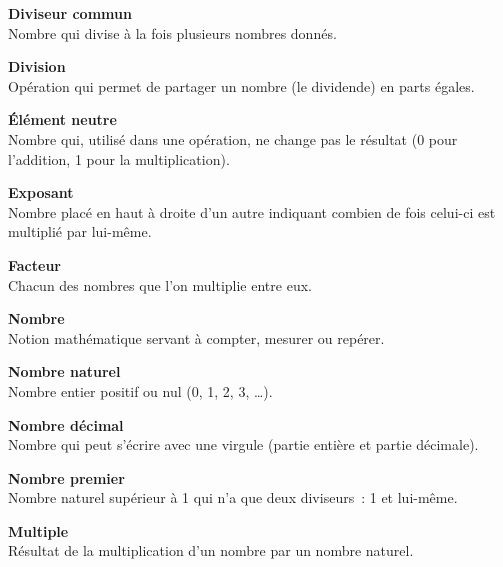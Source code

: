 \begin{tcbraster}[raster columns=2, raster equal height, raster valign=top,raster column skip=2mm, raster row skip=2mm]
\begin{terme}
\textbf{\large Diviseur commun}\\[2pt]
{\small Nombre qui divise à la fois plusieurs nombres donnés.}
\end{terme}
\begin{terme}
\textbf{\large Division}\\[2pt]
{\small Opération qui permet de partager un nombre (le dividende) en parts égales.}
\end{terme}
\begin{terme}
\textbf{\large Élément neutre}\\[2pt]
{\small Nombre qui, utilisé dans une opération, ne change pas le résultat (0 pour l'addition, 1 pour la multiplication).}
\end{terme}
\begin{terme}
\textbf{\large Exposant}\\[2pt]
{\small Nombre placé en haut à droite d'un autre indiquant combien de fois celui-ci est multiplié par lui-même.}
\end{terme}
\begin{terme}
\textbf{\large Facteur}\\[2pt]
{\small Chacun des nombres que l'on multiplie entre eux.}
\end{terme}
\begin{terme}
\textbf{\large Nombre}\\[2pt]
{\small Notion mathématique servant à compter, mesurer ou repérer.}
\end{terme}
\begin{terme}
\textbf{\large Nombre naturel}\\[2pt]
{\small Nombre entier positif ou nul (0, 1, 2, 3, \ldots).}
\end{terme}
\begin{terme}
\textbf{\large Nombre décimal}\\[2pt]
{\small Nombre qui peut s'écrire avec une virgule (partie entière et partie décimale).}
\end{terme}
\begin{terme}
\textbf{\large Nombre premier}\\[2pt]
{\small Nombre naturel supérieur à 1 qui n'a que deux diviseurs~: 1 et lui-même.}
\end{terme}
\begin{terme}
\textbf{\large Multiple}\\[2pt]
{\small Résultat de la multiplication d'un nombre par un nombre naturel.}
\end{terme}
\begin{terme}

\end{terme}
\end{tcbraster}
